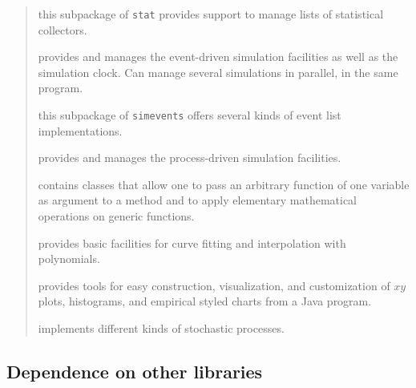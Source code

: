 \begin{latexonly}
\begin{verse}
  this subpackage of \texttt{stat}
  provides support to manage lists of statistical collectors.

  provides and manages the event-driven simulation facilities as well
  as the simulation clock.  Can manage several simulations in parallel,
  in the same program.

 this subpackage of \texttt{simevents} offers several kinds of event
 list implementations.

  provides and manages the process-driven simulation facilities.
%

 contains classes that allow one to pass an arbitrary function of one variable
 as argument to a method
 and to apply elementary mathematical operations on generic functions.

provides basic facilities for curve fitting and interpolation
with polynomials. %

provides tools for easy construction, visualization, and customization
of $xy$ plots, histograms, and empirical styled charts
from a Java program.

implements different kinds of stochastic processes.
\end{verse}
\end{latexonly}  %



\subsection*{Dependence on other libraries}

